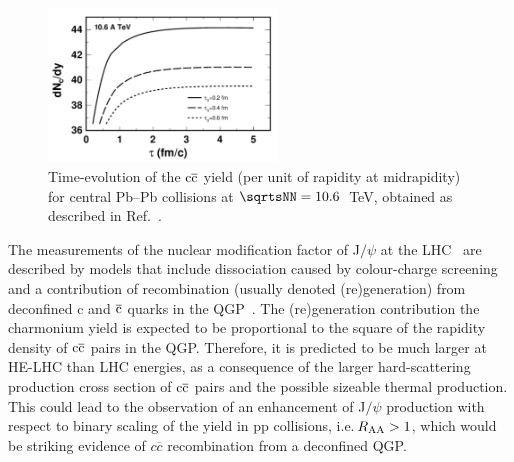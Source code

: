 \documentclass[../report.tex]{subfiles}
\begin{document}
\begin{figure}[!t]
\begin{center}
\includegraphics[width=0.54\textwidth]{helhc/figs/charmKo_PbPbHE.pdf}
\caption{Time-evolution of the $\rm c\overline c$ yield
  (per unit of rapidity at midrapidity) for central Pb--Pb collisions
  at $\sqrtsNN=10.6$~TeV, obtained as described in Ref.~\cite{Liu:2016zle}.}
\label{fig:thermalcharm}
\end{center}
\end{figure}




The measurements of the nuclear modification factor of J$/\psi$ at the LHC~\cite{Adam:2015isa,Adam:2015rba,Chatrchyan:2012np} 
are described by models that include dissociation caused by
colour-charge screening and a contribution of recombination
(usually denoted (re)generation) from deconfined c and $\rm \overline c$
quarks in the QGP~\cite{Liu:2009nb,Zhao:2011cv,Andronic:2011yq}. 
The (re)generation contribution the charmonium yield is expected to be proportional to the square of the rapidity density of $\rm c\overline c$ pairs in the QGP. 
Therefore, it is predicted to be much larger
at HE-LHC than LHC energies, as a consequence of the larger hard-scattering
production cross section of $\rm c\overline c$ pairs and the possible 
sizeable thermal production.
This could lead to the observation of an enhancement of J$/\psi$
production with respect to binary scaling of the yield in pp
collisions, i.e.\,$R_{\rm AA}>1$, which would be striking evidence of 
$c\overline c$ recombination from a deconfined QGP.


\end{document}
